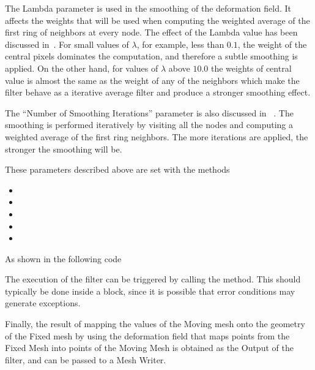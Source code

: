 \documentclass{InsightArticle}
\begin{document}
The Lambda parameter is used in the smoothing of the deformation field. It
affects the weights that will be used when computing the weighted average of
the first ring of neighbors at every node. The effect of the Lambda value has
been discussed in~\cite{MeshSmoothingIJ2009}. For small values of $\lambda$,
for example, less than $0.1$, the weight of the central pixels dominates the
computation, and therefore a subtle smoothing is applied. On the other hand,
for values of $\lambda$ above $10.0$ the weights of central value is almost the
same as the weight of any of the neighbors which make the filter behave as a
iterative average filter and produce a stronger smoothing effect.

The ``Number of Smoothing Iterations'' parameter is also discussed in
~\cite{MeshSmoothingIJ2009}. The smoothing is performed iteratively by visiting
all the nodes and computing a weighted average of the first ring neighbors. The
more iterations are applied, the stronger the smoothing will be.

These parameters described above are set with the methods

\begin{itemize}
\item {}
\item {}
\item {}
\item {}
\item {}
\end{itemize}

As shown in the following code

\begin{center}

\end{center}

The execution of the filter can be triggered by calling the 
method. This should typically be done inside a  block, since it
is possible that error conditions may generate exceptions.


\begin{center}

\end{center}

Finally, the result of mapping the values of the Moving mesh onto the geometry
of the Fixed mesh by using the deformation field that maps points from the
Fixed Mesh into points of the Moving Mesh is obtained as the Output of the filter,
and can be passed to a Mesh Writer.
\end{document}
